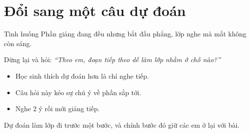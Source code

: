 \section{Đổi sang một câu dự đoán}
\begin{tinhhuong}{Tình huống}
Phần giảng đang đều nhưng bắt đầu phẳng, lớp nghe mà mắt không còn sáng.
\end{tinhhuong}
\begin{goiydungngay}
Dừng lại và hỏi: \textit{``Theo em, đoạn tiếp theo dễ làm lớp nhầm ở chỗ nào?''}
\begin{itemize}
\item Học sinh thích dự đoán hơn là chỉ nghe tiếp.
\item Câu hỏi này kéo sự chú ý về phần sắp tới.
\item Nghe 2 ý rồi mới giảng tiếp.
\end{itemize}
\end{goiydungngay}
\begin{cauchot}
Dự đoán làm lớp đi trước một bước, và chính bước đó giữ các em ở lại với bài.
\end{cauchot}
